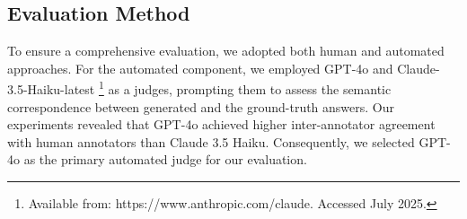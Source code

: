 \documentclass[letterpaper]{article}
\begin{document}



\subsection{Evaluation Method}
To ensure a comprehensive evaluation, we adopted both human and automated approaches. For the automated component, we employed GPT-4o and Claude-3.5-Haiku-latest \footnote{Available from: https://www.anthropic.com/claude. Accessed July 2025.} as a judges, prompting them to assess the semantic correspondence between generated and the ground-truth answers. Our experiments revealed that GPT-4o achieved higher inter-annotator agreement with human annotators than Claude 3.5 Haiku. Consequently, we selected GPT-4o as the primary automated judge for our evaluation.
\end{document}
